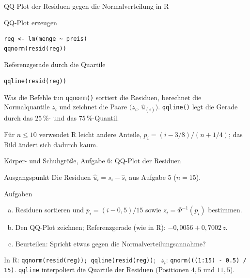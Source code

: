 \documentclass[aspectratio=169,11pt]{beamer}
\begin{document}


\begin{frame}[fragile]{QQ-Plot der Residuen gegen die Normalverteilung in R}
  \begin{block}{QQ-Plot erzeugen}
\begin{lstlisting}
reg <- lm(menge ~ preis)
qqnorm(resid(reg))
\end{lstlisting}
  \end{block}

  \begin{block}{Referenzgerade durch die Quartile}
\begin{lstlisting}
qqline(resid(reg))
\end{lstlisting}
  \end{block}

  \begin{exampleblock}{Was die Befehle tun}
    \texttt{qqnorm()} sortiert die Residuen, berechnet die Normalquantile
    $z_i$ und zeichnet die Paare $\bigl(z_i,\,\hat{u}_{(i)}\bigr)$.
    \texttt{qqline()} legt die Gerade durch das $25\,\%$- und das
    $75\,\%$-Quantil.
  \end{exampleblock}
  \footnotesize Für $n \le 10$ verwendet R leicht andere Anteile,
  $p_i = (i - 3/8)/(n + 1/4)$; das Bild ändert sich dadurch kaum.
\end{frame}

\begin{frame}{Körper- und Schuhgröße, Aufgabe 6: QQ-Plot der Residuen}
  \begin{block}{Ausgangspunkt}
    Die Residuen $\hat{u}_i = s_i - \hat{s}_i$ aus Aufgabe 5 ($n = 15$).
  \end{block}

  \medskip

  \begin{exampleblock}{Aufgaben}
    \begin{enumerate}[a)]
      \setlength{\itemsep}{2pt}
      \item Residuen sortieren und $p_i = (i - 0{,}5)/15$ sowie
            $z_i = \Phi^{-1}(p_i)$ bestimmen.
      \item Den QQ-Plot zeichnen; Referenzgerade (wie in R): $-0{,}0056 + 0{,}7002\,z$.
      \item Beurteilen: Spricht etwas gegen die Normalverteilungsannahme?
    \end{enumerate}
  \end{exampleblock}

  \footnotesize In R: \texttt{qqnorm(resid(reg)); qqline(resid(reg))}; \ $z_i$:
  \texttt{qnorm(((1:15) - 0.5) / 15)}. \texttt{qqline} interpoliert die Quartile
  der Residuen (Positionen $4{,}5$ und $11{,}5$).
\end{frame}
\end{document}
